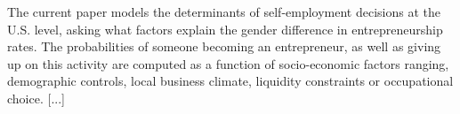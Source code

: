 The current paper models the determinants of self-employment decisions at the U.S. level, asking what factors explain the gender difference in entrepreneurship rates. The probabilities of someone becoming an entrepreneur, as well as giving up on this activity are computed as a function of  socio-economic factors ranging, demographic controls, local business climate, liquidity constraints or occupational choice. [...] 